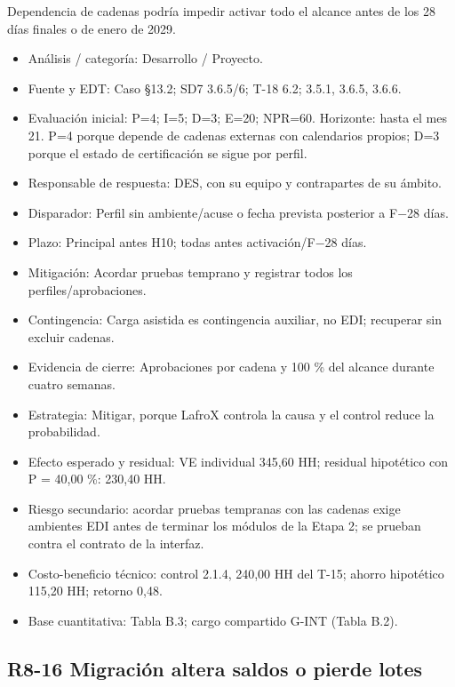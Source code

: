 Dependencia de cadenas podría impedir activar todo el alcance antes de los 28 días finales o de enero de 2029.

\begin{itemize}[leftmargin=*,itemsep=3pt]
\item Análisis / categoría: Desarrollo / Proyecto.
\item Fuente y EDT: Caso §13.2; SD7 3.6.5/6; T-18 6.2; 3.5.1, 3.6.5, 3.6.6.
\item Evaluación inicial: P=4; I=5; D=3; E=20; NPR=60. Horizonte: hasta el mes 21. P=4 porque depende de cadenas externas con calendarios propios; D=3 porque el estado de certificación se sigue por perfil.
\item Responsable de respuesta: DES, con su equipo y contrapartes de su ámbito.
\item Disparador: Perfil sin ambiente/acuse o fecha prevista posterior a F\ensuremath{-}28 días.
\item Plazo: Principal antes H10; todas antes activación/F\ensuremath{-}28 días.
\item Mitigación: Acordar pruebas temprano y registrar todos los perfiles/aprobaciones.
\item Contingencia: Carga asistida es contingencia auxiliar, no EDI; recuperar sin excluir cadenas.
\item Evidencia de cierre: Aprobaciones por cadena y 100 \% del alcance durante cuatro semanas.
\item Estrategia: Mitigar, porque LafroX controla la causa y el control reduce la probabilidad.
\item Efecto esperado y residual: VE individual 345,60 HH; residual hipotético con P = 40,00 \%: 230,40 HH.
\item Riesgo secundario: acordar pruebas tempranas con las cadenas exige ambientes EDI antes de terminar los módulos de la Etapa 2; se prueban contra el contrato de la interfaz.
\item Costo-beneficio técnico: control 2.1.4, 240,00 HH del T-15; ahorro hipotético 115,20 HH; retorno 0,48.
\item Base cuantitativa: Tabla B.3; cargo compartido G-INT (Tabla B.2).
\end{itemize}

\subsection*{R8-16 \textemdash{} Migración altera saldos o pierde lotes}


